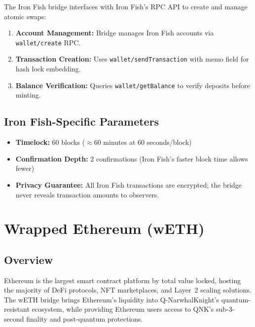 \documentclass[11pt,a4paper]{article}
\begin{document}
The Iron Fish bridge interfaces with Iron Fish's RPC API to create and manage atomic swaps:

\begin{enumerate}
    \item \textbf{Account Management:} Bridge manages Iron Fish accounts via \texttt{wallet/create} RPC.
    \item \textbf{Transaction Creation:} Uses \texttt{wallet/sendTransaction} with memo field for hash lock embedding.
    \item \textbf{Balance Verification:} Queries \texttt{wallet/getBalance} to verify deposits before minting.
\end{enumerate}

\subsection{Iron Fish-Specific Parameters}

\begin{itemize}
    \item \textbf{Timelock:} 60 blocks ($\approx 60$ minutes at 60 seconds/block)
    \item \textbf{Confirmation Depth:} 2 confirmations (Iron Fish's faster block time allows fewer)
    \item \textbf{Privacy Guarantee:} All Iron Fish transactions are encrypted; the bridge never reveals transaction amounts to observers.
\end{itemize}

\section{Wrapped Ethereum (wETH)}
\label{sec:weth}

\subsection{Overview}

Ethereum is the largest smart contract platform by total value locked, hosting the majority of DeFi protocols, NFT marketplaces, and Layer~2 scaling solutions. The wETH bridge brings Ethereum's liquidity into Q-NarwhalKnight's quantum-resistant ecosystem, while providing Ethereum users access to QNK's sub-3-second finality and post-quantum protections.
\end{document}
